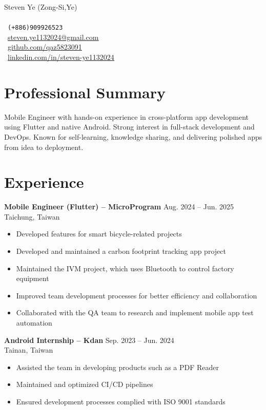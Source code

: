 \documentclass[a4paper,10pt]{article}
\makeatletter
\def\Name{Steven Ye (Zong-Si,Ye)}
\def\Phone{(+886)909926523}
\def\Email{steven.ye1132024@gmail.com}
\def\LinkedIn{https://www.linkedin.com/in/steven-ye1132024/}
\def\GitHub{https://github.com/qaz5823091}
\makeatother
\begin{document}
{\huge \Name} \\ \\
\textcolor{customgreen}{\faPhone} \ \texttt{\Phone} \\
\textcolor{customgreen}{\faEnvelope} \ \href{mailto:\Email}{\underline{\Email}} \\
\textcolor{customgreen}{\faGithub} \ \underline{\href{\GitHub}{github.com/qaz5823091}} \\
\textcolor{customgreen}{\faLinkedin} \ \underline{\href{\LinkedIn}{linkedin.com/in/steven-ye1132024}}

\section*{Professional Summary}
Mobile Engineer with hands-on experience in cross-platform app development using Flutter and native Android. Strong interest in full-stack development and DevOps. Known for self-learning, knowledge sharing, and delivering polished apps from idea to deployment.
\section*{Experience}

\textbf{Mobile Engineer (Flutter) -- MicroProgram}  \hfill Aug. 2024 -- Jun. 2025 \\
Taichung, Taiwan
\begin{itemize}[left=0pt, label={--}]
    \item Developed features for smart bicycle-related projects
    \item Developed and maintained a carbon footprint tracking app project
    \item Maintained the IVM project, which uses Bluetooth to control factory equipment
    \item Improved team development processes for better efficiency and collaboration
    \item Collaborated with the QA team to research and implement mobile app test automation
\end{itemize}

\textbf{Android Internship -- Kdan} \hfill Sep. 2023 -- Jun. 2024 \\
Tainan, Taiwan
\begin{itemize}[left=0pt, label={--}]
    \item Assisted the team in developing products such as a PDF Reader
    \item Maintained and optimized CI/CD pipelines
    \item Ensured development processes complied with ISO 9001 standards
\end{itemize}
\end{document}
